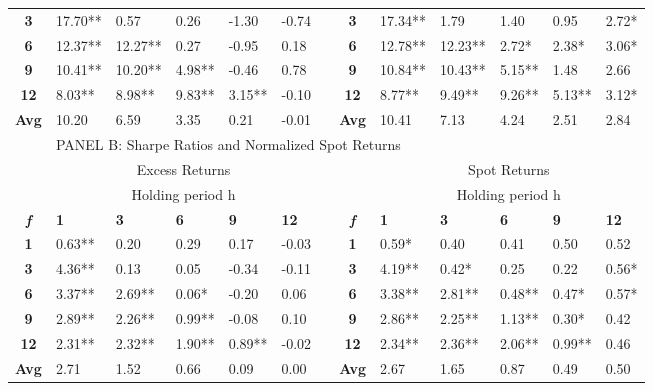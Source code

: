 \documentclass{article}
\begin{document}
\begin{table}[t!]
\begin{adjustwidth}{-1.3cm}{}
\begin{tabular}{clllllcclllll}
    \textbf{3} & 17.70** & 0.57  & 0.26  & -1.30 & -0.74 &       & \textbf{3} & 17.34** & 1.79  & 1.40  & 0.95  & 2.72* \\
    \textbf{6} & 12.37** & 12.27** & 0.27  & -0.95 & 0.18  &       & \textbf{6} & 12.78** & 12.23** & 2.72* & 2.38* & 3.06* \\
    \textbf{9} & 10.41** & 10.20** & 4.98** & -0.46 & 0.78  &       & \textbf{9} & 10.84** & 10.43** & 5.15** & 1.48  & 2.66 \\
    \textbf{12} & 8.03** & 8.98** & 9.83** & 3.15** & -0.10 &       & \textbf{12} & 8.77** & 9.49** & 9.26** & 5.13** & 3.12* \\
\cmidrule{2-6}\cmidrule{9-13}    \textbf{Avg} & 10.20 & 6.59  & 3.35  & 0.21  & -0.01 &       & \textbf{Avg} & 10.41 & 7.13  & 4.24  & 2.51  & 2.84 \\
    \midrule
          & \multicolumn{12}{l}{PANEL B: Sharpe Ratios and Normalized Spot Returns} \\
    \midrule
          & \multicolumn{5}{c}{Excess Returns}    &       &       & \multicolumn{5}{c}{Spot Returns} \\
\cmidrule{2-6}\cmidrule{9-13}          & \multicolumn{5}{c}{Holding period h}  &       &       & \multicolumn{5}{c}{Holding period h} \\
    \textit{\textbf{f}} & \textbf{1} & \textbf{3} & \textbf{6} & \textbf{9} & \textbf{12} &       & \textit{\textbf{f}} & \textbf{1} & \textbf{3} & \textbf{6} & \textbf{9} & \textbf{12} \\
\cmidrule{2-6}\cmidrule{9-13}    \textbf{1} & 0.63** & 0.20  & 0.29  & 0.17  & -0.03 &       & \textbf{1} & 0.59* & 0.40  & 0.41  & 0.50  & 0.52 \\
    \textbf{3} & 4.36** & 0.13  & 0.05  & -0.34 & -0.11 &       & \textbf{3} & 4.19** & 0.42* & 0.25  & 0.22  & 0.56* \\
    \textbf{6} & 3.37** & 2.69** & 0.06* & -0.20 & 0.06  &       & \textbf{6} & 3.38** & 2.81** & 0.48** & 0.47* & 0.57* \\
    \textbf{9} & 2.89** & 2.26** & 0.99** & -0.08 & 0.10  &       & \textbf{9} & 2.86** & 2.25** & 1.13** & 0.30* & 0.42 \\
    \textbf{12} & 2.31** & 2.32** & 1.90** & 0.89** & -0.02 &       & \textbf{12} & 2.34** & 2.36** & 2.06** & 0.99** & 0.46 \\
\cmidrule{2-6}\cmidrule{9-13}    \textbf{Avg} & 2.71  & 1.52  & 0.66  & 0.09  & 0.00  &       & \textbf{Avg} & 2.67  & 1.65  & 0.87  & 0.49  & 0.50 \\
    \bottomrule
    \end{tabular}%
  \label{EWMR}%
  \end{adjustwidth}
\end{table}%
\end{document}
